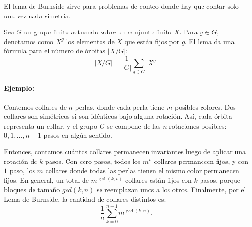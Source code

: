 El lema de Burnside sirve para problemas de conteo donde hay que contar solo una vez cada simetría.

Sea $G$ un grupo finito actuando sobre un conjunto finito $X$. Para $g \in G$, denotamos como $X^g$ 
los elementos de $X$ que están fijos por $g$. El lema da una fórmula para
el número de órbitas $\left|X / G\right|$:
\[
	\left| X / G \right| = \frac{1}{|G|} \sum_{g\in G} \left| X^g \right|
\]

\paragraph{Ejemplo:} Contemos collares de $n$ perlas, donde cada perla tiene $m$ posibles colores. Dos collares son simétricos si
son idénticos bajo alguna rotación. Así, cada órbita representa un collar, y el grupo $G$ se compone de las $n$ rotaciones posibles: $0, 1, \dots, n-1$
pasos en algún sentido.

Entonces, contamos cuántos collares permanecen invariantes luego de aplicar una rotación de $k$ pasos. Con cero pasos, todos los $m^n$ collares
permanecen fijos, y con $1$ paso, los $m$ collares donde todas las perlas tienen el mismo color permanecen fijos. En general, un total de $m^{\gcd(k,n)}$ collares
están fijos con $k$ pasos, porque bloques de tamaño $gcd(k,n)$ se reemplazan unos a los otros. Finalmente, por el Lema de Burnside, la cantidad de collares distintos es:
\[
	\frac{1}{n} \sum_{k=0}^{n-1} m^{\gcd(k,n)}.
\]
